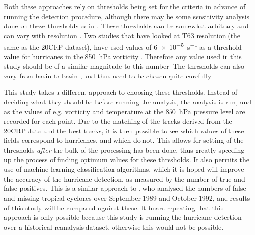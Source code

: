\documentclass[pdftex,12pt,a4paper]{report}
\begin{document}
Both these approaches rely on thresholds being set for the criteria in advance of running the
detection procedure, although there may be some sensitivity analysis done on these thresholds as in
\textcite{walsh1995}. These thresholds can be somewhat arbitrary and can vary with resolution
\parencite{walsh2007}. Two studies that have looked at T63 resolution (the same as the 20CRP
dataset), have used values of \SI{6e-5}{s^{-1}} as a threshold value for hurricanes in the
\SI{850}{hPa} vorticity \parencite{bengtsson2006, bengtsson2007}.  Therefore any value used in this
study should be of a similar magnitude to this number.  The thresholds can also vary from basin to
basin \parencite{camargo}, and thus need to be chosen quite carefully. 

This study takes a different approach to choosing these thresholds. Instead of deciding what they
should be before running the analysis, the analysis is run, and as the values of e.g. vorticity and
temperature at the \SI{850}{hPa} pressure level are recorded for each point. Due to the matching of
the tracks derived from the 20CRP data and the best tracks, it is then possible to see which values
of these fields correspond to hurricanes, and which do not. This allows for setting of the
thresholds \textit{after} the bulk of the processing has been done, thus greatly speeding up the
process of finding optimum values for these thresholds. It also permits the use of machine learning
classification algorithms, which it is hoped will improve the accuracy of the hurricane detection,
as measured by the number of true and false positives. This is a similar approach to
\textcite{walsh1995}, who analysed the numbers of false and missing tropical cyclones over September
1989 and October 1992, and results of this study will be compared against these. It bears repeating
that this approach is only possible because this study is running the hurricane detection over a
historical reanalysis dataset, otherwise this would not be possible.
\end{document}
